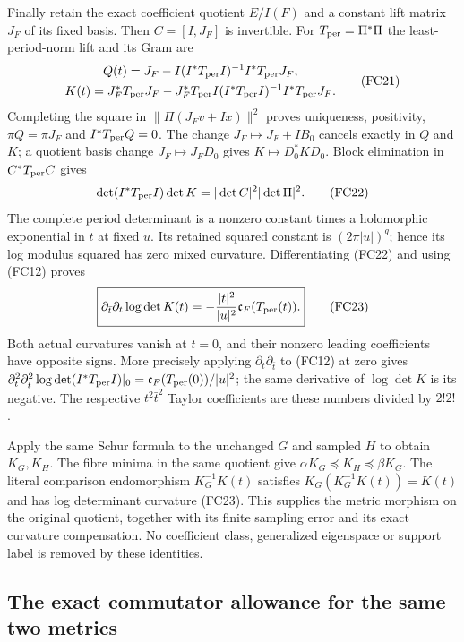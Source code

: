 \documentclass{article}
\begin{document}
Finally retain the exact coefficient quotient $E/I(F)$ and a constant
lift matrix $J_F$ of its fixed basis. Then $C=[I,J_F]$ is invertible.
For $T_{\rm per}=\Pi^*\Pi$ the least-period-norm lift and its Gram are
\[
\begin{gathered}
 Q(t)=J_F-I(I^*T_{\rm per}I)^{-1}I^*T_{\rm per}J_F,\\
 K(t)=J_F^*T_{\rm per}J_F
   -J_F^*T_{\rm per}I(I^*T_{\rm per}I)^{-1}I^*T_{\rm per}J_F.
\end{gathered}\tag{FC21}
\]
Completing the square in $\|\Pi(J_Fv+Ix)\|^2$ proves uniqueness,
positivity, $\pi Q=\pi J_F$ and $I^*T_{\rm per}Q=0$.
The change $J_F\mapsto J_F+IB_0$ cancels exactly in $Q$ and $K$;
a quotient basis change $J_F\mapsto J_FD_0$ gives $K\mapsto D_0^*KD_0$.
Block elimination in $C^*T_{\rm per}C$ gives
\[
 \det(I^*T_{\rm per}I)\det K
       =|\det C|^2|\det\Pi|^2.
 \tag{FC22}
\]
The complete period determinant is a nonzero constant times a
holomorphic exponential in $t$ at fixed $u$. Its retained squared
constant is $(2\pi|u|)^q$; hence its log modulus squared has zero mixed
curvature. Differentiating (FC22) and using (FC12) proves
\[
 \boxed{\partial_{\bar t}\partial_t\log\det K(t)
       =-\frac{|t|^2}{|u|^2}\mathfrak c_F(T_{\rm per}(t)).}
 \tag{FC23}
\]
Both actual curvatures vanish at $t=0$, and their nonzero leading
coefficients have opposite signs. More precisely applying
$\partial_t\partial_{\bar t}$ to (FC12) at zero gives
$\partial_t^2\partial_{\bar t}^2\log\det(I^*T_{\rm per}I)|_0
=\mathfrak c_F(T_{\rm per}(0))/|u|^2$; the same derivative of
$\log\det K$ is its negative. The respective $t^2\bar t^2$ Taylor
coefficients are these numbers divided by $2!2!$.

Apply the same Schur formula to the unchanged $G$ and sampled $H$ to
obtain $K_G,K_H$. The fibre minima in the same quotient give
$\alpha K_G\preceq K_H\preceq\beta K_G$.
The literal comparison endomorphism $K_G^{-1}K(t)$ satisfies
$K_G(K_G^{-1}K(t))=K(t)$ and has log determinant curvature (FC23).
This supplies the metric morphism on the original quotient, together
with its finite sampling error and its exact curvature compensation.
No coefficient class, generalized eigenspace or support label is
removed by these identities.

\subsection{The exact commutator allowance for the same two metrics}
\end{document}
